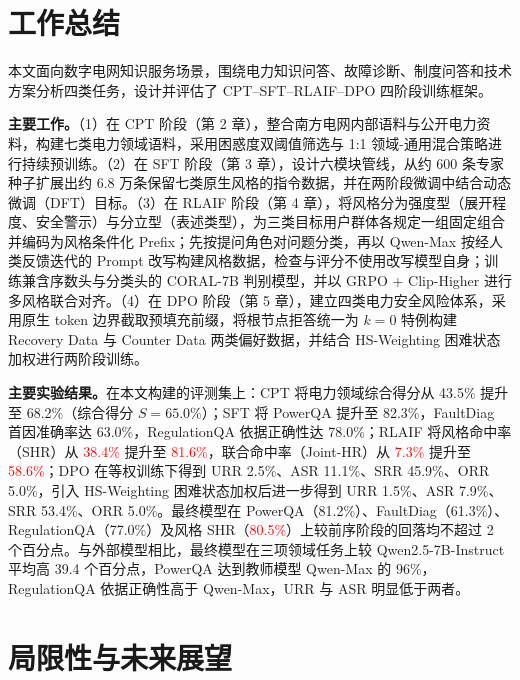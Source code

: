 \documentclass[fontset=fandol,type=master,campus=shenzhen,etitleauto=true]{hithesisbook}
\newcommand{\rev}[1]{\textcolor{red}{#1}}
\begin{document}
\backmatter
\begin{conclusions}
\label{ux603bux7ed3ux4e0eux5c55ux671b}

\section*{工作总结}\label{ux5de5ux4f5cux603bux7ed3}

本文面向数字电网知识服务场景，围绕电力知识问答、故障诊断、制度问答和技术方案分析四类任务，设计并评估了 CPT--SFT--RLAIF--DPO 四阶段训练框架。

\textbf{主要工作。}（1）在 CPT 阶段（第 2 章），整合南方电网内部语料与公开电力资料，构建七类电力领域语料，采用困惑度双阈值筛选与 1:1 领域-通用混合策略进行持续预训练。（2）在 SFT 阶段（第 3 章），设计六模块管线，从约 600 条专家种子扩展出约 6.8 万条保留七类原生风格的指令数据，并在两阶段微调中结合动态微调（DFT）目标。（3）在 RLAIF 阶段（第 4 章），将风格分为强度型（展开程度、安全警示）与分立型（表述类型），为三类目标用户群体各规定一组固定组合并编码为风格条件化 Prefix；先按提问角色对问题分类，再以 Qwen-Max 按经人类反馈迭代的 Prompt 改写构建风格数据，检查与评分不使用改写模型自身；训练兼含序数头与分类头的 CORAL-7B 判别模型，并以 GRPO + Clip-Higher 进行多风格联合对齐。（4）在 DPO 阶段（第 5 章），建立四类电力安全风险体系，采用原生 token 边界截取预填充前缀，将根节点拒答统一为 $k=0$ 特例构建 Recovery Data 与 Counter Data 两类偏好数据，并结合 HS-Weighting 困难状态加权进行两阶段训练。

\textbf{主要实验结果。}在本文构建的评测集上：CPT 将电力领域综合得分从 43.5\% 提升至 68.2\%（综合得分 $S=65.0\%$）；SFT 将 PowerQA 提升至 82.3\%，FaultDiag 首因准确率达 63.0\%，RegulationQA 依据正确性达 78.0\%；RLAIF 将风格命中率（SHR）从 \rev{38.4\%} 提升至 \rev{81.6\%}，联合命中率（Joint-HR）从 \rev{7.3\%} 提升至 \rev{58.6\%}；DPO 在等权训练下得到 URR 2.5\%、ASR 11.1\%、SRR 45.9\%、ORR 5.0\%，引入 HS-Weighting 困难状态加权后进一步得到 URR 1.5\%、ASR 7.9\%、SRR 53.4\%、ORR 5.0\%。最终模型在 PowerQA（81.2\%）、FaultDiag（61.3\%）、RegulationQA（77.0\%）及风格 SHR（\rev{80.5\%}）上较前序阶段的回落均不超过 2 个百分点。与外部模型相比，最终模型在三项领域任务上较 Qwen2.5-7B-Instruct 平均高 39.4 个百分点，PowerQA 达到教师模型 Qwen-Max 的 96\%，RegulationQA 依据正确性高于 Qwen-Max，URR 与 ASR 明显低于两者。

\section*{局限性与未来展望}\label{ux5c40ux9650ux6027ux4e0eux672aux6765ux5c55ux671b}


\end{conclusions}
\end{document}

